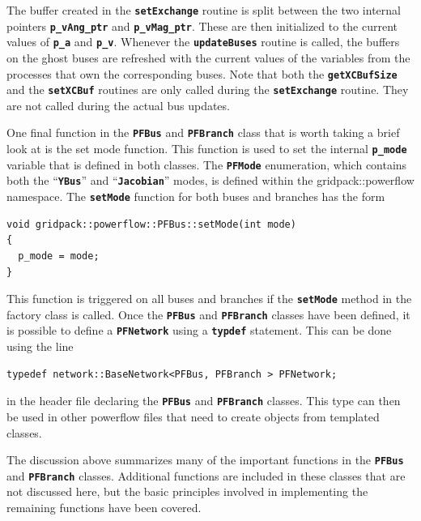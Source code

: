 The buffer created in the \texttt{\textbf{setExchange}} routine is split between the two internal pointers \texttt{\textbf{p\_vAng\_ptr}} and \texttt{\textbf{p\_vMag\_ptr}}. These are then initialized to the current values of \texttt{\textbf{p\_a}} and \texttt{\textbf{p\_v}}. Whenever the \texttt{\textbf{updateBuses}} routine is called, the buffers on the ghost buses are refreshed with the current values of the variables from the processes that own the corresponding buses. Note that both the \texttt{\textbf{getXCBufSize}} and the \texttt{\textbf{setXCBuf}} routines are only called during the \texttt{\textbf{setExchange}} routine. They are not called during the actual bus updates.

One final function in the \texttt{\textbf{PFBus}} and \texttt{\textbf{PFBranch}} class that is worth taking a brief look at is the set mode function. This function is used to set the internal \texttt{\textbf{p\_mode}} variable that is defined in both classes. The \texttt{\textbf{PFMode}} enumeration, which contains both the ``\texttt{\textbf{YBus}}'' and ``\texttt{\textbf{Jacobian}}'' modes, is defined within the gridpack::powerflow namespace. The \texttt{\textbf{setMode}} function for both buses and branches has the form

{
\color{red}
\begin{Verbatim}[fontseries=b]
void gridpack::powerflow::PFBus::setMode(int mode)
{
  p_mode = mode;
}
\end{Verbatim}
}

This function is triggered on all buses and branches if the \texttt{\textbf{setMode}} method in the factory class is called.
Once the \texttt{\textbf{PFBus}} and \texttt{\textbf{PFBranch}} classes have been defined, it is possible to define a \texttt{\textbf{PFNetwork}} using a \texttt{\textbf{typdef}} statement. This can be done using the line

{
\color{red}
\begin{Verbatim}[fontseries=b]
typedef network::BaseNetwork<PFBus, PFBranch > PFNetwork;
\end{Verbatim}
}

in the header file declaring the \texttt{\textbf{PFBus}} and \texttt{\textbf{PFBranch}} classes. This type can then be used in other powerflow files that need to create objects from templated classes.

The discussion above summarizes many of the important functions in the \texttt{\textbf{PFBus}} and \texttt{\textbf{PFBranch}} classes. Additional functions are included in these classes that are not discussed here, but the basic principles involved in implementing the remaining functions have been covered. 

